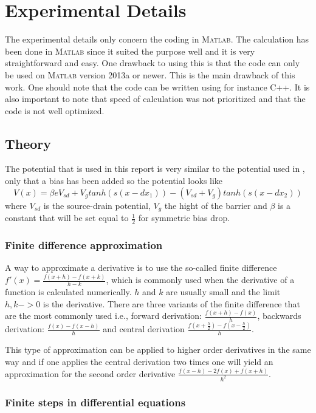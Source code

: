 \documentclass[a4paper]{article}
\begin{document}
\section{Experimental Details}
The experimental details only concern the coding in \textsc{Matlab}.
The calculation has been done in \textsc{Matlab} since it suited the purpose well and it is very straightforward and easy.
One drawback to using this is that the code can only be used on \textsc{Matlab} version 2013a or newer.
This is the main drawback of this work. One should note that the code can be written using for instance C++.
It is also important to note that speed of calculation was not prioritized and that the code is not well optimized.

\subsection{Theory}
The potential that is used in this report is very similar to the potential used in \cite{5}, only that a bias has been added so the potential looks like \begin{equation}
\label{potential}
V(x) = \beta e V_{sd}+V_{g} tanh(s (x-dx_{1}))-(V_{sd}+V_{g}) tanh(s (x-dx_{2}))
\end{equation}
where $V_{sd}$ is the source-drain potential, $V_{g}$ the hight of the barrier and $\beta$ is a constant that will be set equal to $\frac{1}{2}$ for symmetric bias drop.
\subsubsection{Finite difference approximation}
A way to approximate a derivative is to use the so-called finite difference $f'(x) =\frac{f(x+h)-f(x+k)}{h-k}$, which is commonly used when the derivative of a function is calculated numerically. $h$ and $k$ are usually small and the limit $h,k->0$ is the derivative.
There are three variants of the finite difference that are the most commonly used i.e., forward derivation: $\frac{f(x+h)-f(x)}{h}$, backwards derivation: $\frac{f(x)-f(x-h)}{h}$ and central derivation $\frac{f(x+\frac{h}{2})-f(x-\frac{h}{2})}{h}$.

This type of approximation can be applied to higher order derivatives in the same way and if one applies the central derivation two times one will yield an approximation for the second order derivative $\frac{f(x-h)- 2f(x) +f(x+h)}{h^2}$.

\subsubsection{Finite steps in differential equations}
\end{document}
